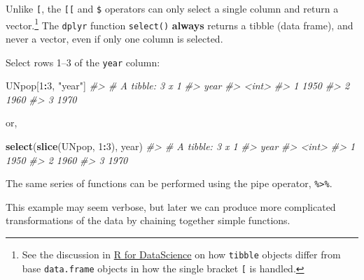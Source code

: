 \documentclass[]{book}
\newenvironment{Shaded}{\begin{snugshade}}{\end{snugshade}}
\newcommand{\KeywordTok}[1]{\textcolor[rgb]{0.13,0.29,0.53}{\textbf{#1}}}
\newcommand{\DecValTok}[1]{\textcolor[rgb]{0.00,0.00,0.81}{#1}}
\newcommand{\StringTok}[1]{\textcolor[rgb]{0.31,0.60,0.02}{#1}}
\newcommand{\CommentTok}[1]{\textcolor[rgb]{0.56,0.35,0.01}{\textit{#1}}}
\newcommand{\OperatorTok}[1]{\textcolor[rgb]{0.81,0.36,0.00}{\textbf{#1}}}
\newcommand{\NormalTok}[1]{#1}
\let\rmarkdownfootnote\footnote%
\def\footnote{\protect\rmarkdownfootnote}
\theoremstyle{definition}
\theoremstyle{definition}
\theoremstyle{definition}
\theoremstyle{remark}
\begin{document}
Unlike \texttt{{[}}, the \texttt{{[}{[}} and \texttt{\$} operators can
only select a single column and return a vector.\footnote{See the
  discussion in
  \href{http://r4ds.had.co.nz/tibbles.html\#tibbles-vs.data.frame}{R for
  DataScience} on how \texttt{tibble} objects differ from base
  \texttt{data.frame} objects in how the single bracket \texttt{{[}} is
  handled.} The \texttt{dplyr} function \texttt{select()}
\textbf{always} returns a tibble (data frame), and never a vector, even
if only one column is selected.

Select rows 1--3 of the \texttt{year} column:

\begin{Shaded}
\begin{Highlighting}[]
\NormalTok{UNpop[}\DecValTok{1}\OperatorTok{:}\DecValTok{3}\NormalTok{, }\StringTok{"year"}\NormalTok{]}
\CommentTok{#> # A tibble: 3 x 1}
\CommentTok{#>    year}
\CommentTok{#>   <int>}
\CommentTok{#> 1  1950}
\CommentTok{#> 2  1960}
\CommentTok{#> 3  1970}
\end{Highlighting}
\end{Shaded}

or,

\begin{Shaded}
\begin{Highlighting}[]
\KeywordTok{select}\NormalTok{(}\KeywordTok{slice}\NormalTok{(UNpop, }\DecValTok{1}\OperatorTok{:}\DecValTok{3}\NormalTok{), year)}
\CommentTok{#> # A tibble: 3 x 1}
\CommentTok{#>    year}
\CommentTok{#>   <int>}
\CommentTok{#> 1  1950}
\CommentTok{#> 2  1960}
\CommentTok{#> 3  1970}
\end{Highlighting}
\end{Shaded}

The same series of functions can be performed using the pipe operator,
\texttt{\%\textgreater{}\%}.

\begin{Shaded}
\end{Shaded}

This example may seem verbose, but later we can produce more complicated
transformations of the data by chaining together simple functions.
\end{document}
